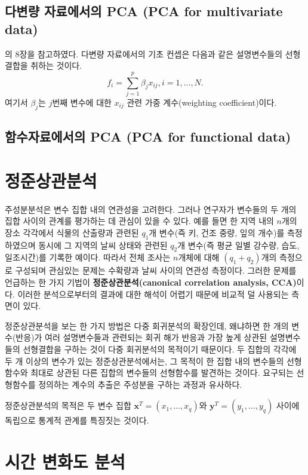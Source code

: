 \documentclass[b5paper,]{scrbook}
\theoremstyle{plain}
\theoremstyle{definition}
\numberwithin{equation}{section}
\begin{document}
\section{다변량 자료에서의 PCA (PCA for multivariate
data)}\label{--pca-pca-for-multivariate-data}

\citep{Ramsay2005}의 8장을 참고하였다. 다변량 자료에서의 기초 컨셉은
다음과 같은 설명변수들의 선형 결합을 취하는 것이다.
\[f_{i}=\sum_{j=1}^{p}\beta_{j}x_{ij}, i=1,\ldots, N.\] 여기서
\(\beta_{j}\)는 \(j\)번째 변수에 대한 \(x_{ij}\) 관련 가중
계수(weighting coefficient)이다.

\section{함수자료에서의 PCA (PCA for functional
data)}\label{-pca-pca-for-functional-data}

\chapter{정준상관분석}\label{CCA}

주성분분석은 변수 집합 내의 연관성을 고려한다. 그러나 연구자가 변수들의
두 개의 집합 사이의 관계를 평가하는 데 관심이 있을 수 있다. 예를 들면 한
지역 내의 \(n\)개의 장소 각각에서 식물의 산출량과 관련된 \(q_{1}\)개
변수(즉 키, 건조 중량, 잎의 개수)를 측정하였으며 동시에 그 지역의 날씨
상태와 관련된 \(q_{2}\)개 변수(즉 평균 일별 강수량, 습도, 일조시간)를
기록한 예이다. 따라서 전체 조사는 \(n\)개체에 대해 \((q_{1}+q_{2})\)개의
측정으로 구성되며 관심있는 문제는 수확량과 날씨 사이의 연관성 측정이다.
그러한 문제를 언급하는 한 가지 기법이 \textbf{정준상관분석(canonical
correlation analysis, CCA)}이다. 이러한 분석으로부터의 결과에 대한
해석이 어렵기 때문에 비교적 덜 사용되는 측면이 있다.

정준상관분석을 보는 한 가지 방법은 다중 회귀분석의 확장인데, 왜냐하면 한
개의 변수(반응)가 여러 설명변수들과 관련되는 회귀 해가 반응과 가장 높게
상관된 설명변수들의 선형결합을 구하는 것이 다중 회귀분석의 목적이기
때문이다. 두 집합의 각각에 두 개 이상의 변수가 있는 정준상관분석에서는,
그 목적이 한 집합 내의 변수들의 선형함수와 최대로 상관된 다른 집합의
변수들의 선형함수를 발견하는 것이다. 요구되는 선형함수를 정의하는 계수의
추출은 주성분을 구하는 과정과 유사하다.

정준상관분석의 목적은 두 변수 집합
\(\mathbf{x}^{T}=(x_{1},\ldots, x_{q})\)와
\(\mathbf{y}^{T}=(y_{1},\ldots, y_{q})\) 사이에 독립으로 통계적 관계를
특징짓는 것이다.

\chapter{시간 변화도 분석}\label{SSA}
\end{document}

